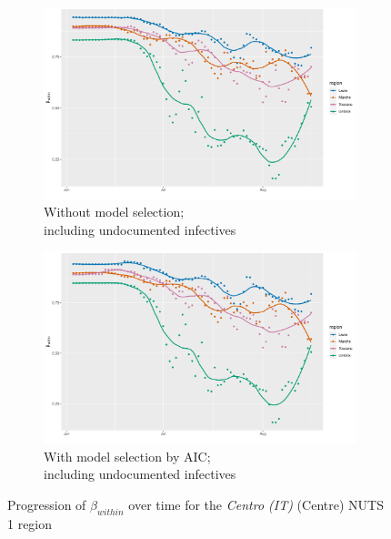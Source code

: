 \documentclass[12pt]{article}
\begin{document}
\begin{appendices}
\begin{figure}[H]
\begin{subfigure}{\textwidth}
    	      \includegraphics[width=0.95\linewidth]{output/model1_lag3_betawithin_Centro (IT)_UndocQuadratic_rolling.pdf}
    	      \caption{Without model selection; \\ including undocumented infectives}
    	      \label{fig:beta_within_over_time_centro_regular_undoc}
    	    \end{subfigure}\newline
    	    \begin{subfigure}{\textwidth}
    	      \centering
    	      \includegraphics[width=0.95\linewidth]{output/model1_lag3_betawithin_Centro (IT)_aic_UndocQuadratic_rolling.pdf}
    	      \caption{With model selection by AIC; \\ including undocumented infectives}
    	      \label{fig:beta_within_over_time_centro_aic_undoc}
    	    \end{subfigure}
    	    \caption{Progression of $\beta_{within}$ over time for the \textit{Centro (IT)} (Centre) NUTS 1 region}
    	    \label{fig:beta_within_over_time_centro}
	    \end{figure}
		

\end{appendices}
\end{document}
